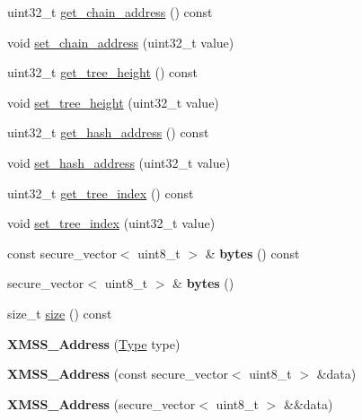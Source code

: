 \begin{DoxyCompactItemize}
\item 
uint32\+\_\+t \hyperlink{class_botan_1_1_x_m_s_s___address_adbab35e6d0dc8a0ff3e5c95ffa73cbee}{get\+\_\+chain\+\_\+address} () const
\item 
void \hyperlink{class_botan_1_1_x_m_s_s___address_a766e70130914b681020366d80c625fce}{set\+\_\+chain\+\_\+address} (uint32\+\_\+t value)
\item 
uint32\+\_\+t \hyperlink{class_botan_1_1_x_m_s_s___address_a7e619c5b15ba74f596eb3d5b6035a0f1}{get\+\_\+tree\+\_\+height} () const
\item 
void \hyperlink{class_botan_1_1_x_m_s_s___address_a9bf7df26a0cfc5fee8bb44e22927f61c}{set\+\_\+tree\+\_\+height} (uint32\+\_\+t value)
\item 
uint32\+\_\+t \hyperlink{class_botan_1_1_x_m_s_s___address_af6ac58ed613b3b523628ccfcde73f7c2}{get\+\_\+hash\+\_\+address} () const
\item 
void \hyperlink{class_botan_1_1_x_m_s_s___address_a0a5d46d9a17f3a39808356d079b592fa}{set\+\_\+hash\+\_\+address} (uint32\+\_\+t value)
\item 
uint32\+\_\+t \hyperlink{class_botan_1_1_x_m_s_s___address_a40990bf9e24b0f2967d18ed6af4197a9}{get\+\_\+tree\+\_\+index} () const
\item 
void \hyperlink{class_botan_1_1_x_m_s_s___address_a9e084bac434f5bca79368d145c4ac991}{set\+\_\+tree\+\_\+index} (uint32\+\_\+t value)
\item 
\mbox{\label{class_botan_1_1_x_m_s_s___address_a6f22da8d3fde8b130555e33154386bba}} 
const secure\+\_\+vector$<$ uint8\+\_\+t $>$ \& {\bfseries bytes} () const
\item 
\mbox{\label{class_botan_1_1_x_m_s_s___address_a3810c637960602319bb78422e8d8f490}} 
secure\+\_\+vector$<$ uint8\+\_\+t $>$ \& {\bfseries bytes} ()
\item 
size\+\_\+t \hyperlink{class_botan_1_1_x_m_s_s___address_a295db70b7603a66df6ebf20667dc9a9f}{size} () const
\item 
\mbox{\label{class_botan_1_1_x_m_s_s___address_ad381cc81c47920eef6390dfbf506f93a}} 
{\bfseries X\+M\+S\+S\+\_\+\+Address} (\hyperlink{class_botan_1_1_x_m_s_s___address_a0101e45c5608cf312b497bf6d855000e}{Type} type)
\item 
\mbox{\label{class_botan_1_1_x_m_s_s___address_ac7a8dd49523446b990c44ad33dbbb47e}} 
{\bfseries X\+M\+S\+S\+\_\+\+Address} (const secure\+\_\+vector$<$ uint8\+\_\+t $>$ \&data)
\item 
\mbox{\label{class_botan_1_1_x_m_s_s___address_a07ce87c9817ac5a4fcb7073ddc5172e7}} 
{\bfseries X\+M\+S\+S\+\_\+\+Address} (secure\+\_\+vector$<$ uint8\+\_\+t $>$ \&\&data)
\end{DoxyCompactItemize}
